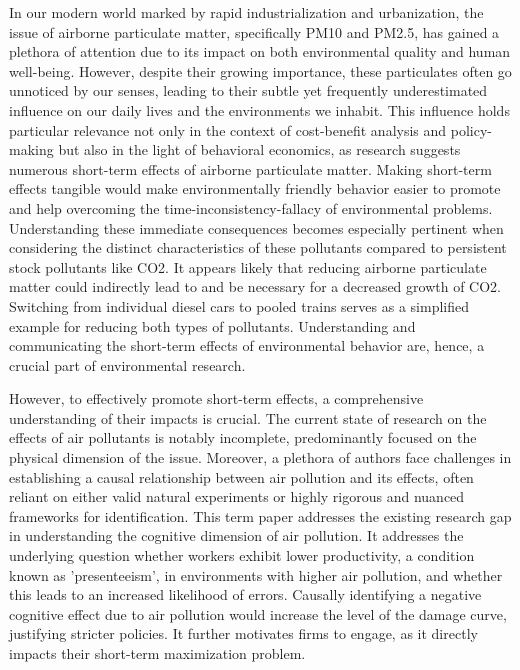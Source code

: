 \documentclass[12pt,a4paper]{article}
\begin{document}
In our modern world marked by rapid industrialization and urbanization, the issue of airborne particulate matter, specifically PM10 and PM2.5, has gained a plethora of attention due to its impact on both environmental quality and human well-being. However, despite their growing importance, these particulates often go unnoticed by our senses, leading to their subtle yet frequently underestimated influence on our daily lives and the environments we inhabit. This influence holds particular relevance not only in the context of cost-benefit analysis and policy-making but also in the light of behavioral economics, as research suggests numerous short-term effects of airborne particulate matter. Making short-term effects tangible would make environmentally friendly behavior easier to promote and help overcoming the time-inconsistency-fallacy of environmental problems. Understanding these immediate consequences becomes especially pertinent when considering the distinct characteristics of these pollutants compared to persistent stock pollutants like CO2. It appears likely that reducing airborne particulate matter could indirectly lead to and be necessary for  a decreased growth of CO2. Switching from individual diesel cars to pooled trains serves as a simplified example for reducing both types of pollutants. Understanding and communicating the short-term effects of environmental behavior are, hence, a crucial part of environmental research. 

However, to effectively promote short-term effects, a comprehensive understanding of their impacts is crucial. The current state of research on the effects of air pollutants is notably incomplete, predominantly focused on the physical dimension of the issue. Moreover, a plethora of authors face challenges in establishing a causal relationship between air pollution and its effects, often reliant on either valid natural experiments or highly rigorous and nuanced frameworks for identification. This term paper addresses the existing research gap in understanding the cognitive dimension of air pollution. It addresses the underlying question whether workers exhibit lower productivity, a condition known as 'presenteeism', in environments with higher air pollution, and whether this leads to an increased likelihood of errors. Causally identifying a negative cognitive effect due to air pollution would increase the level of the damage curve, justifying stricter policies. It further motivates firms to engage, as it directly impacts their short-term maximization problem. 
\end{document}
